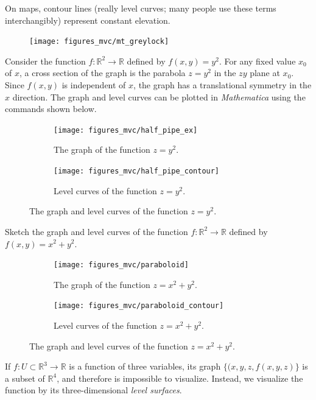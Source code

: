 \documentclass[12pt,letterpaper,reqno]{article}
\numberwithin{equation}{section}
\begin{document}
{\begin{example}
\end{example}
\begin{example}
	On maps, contour lines (really level curves; many people use these terms interchangibly) represent constant elevation.
	\begin{figure}[h]
		\begin{center}
		\texttt{[image: figures\_mvc/mt\_greylock]}
	\end{center}
	\end{figure}
\end{example}
\newpage 
\begin{example}
Consider the function $f:\mathbb{R}^2 \to \mathbb{R}$ defined by $f(x,y)=y^2$. For any fixed value $x_0$ of $x$, a cross section of the graph is the parabola $z=y^2$ in the $zy$ plane at $x_0$. Since $f(x,y)$ is independent of $x$, the graph has a translational symmetry in the $x$ direction. The graph and level curves can be plotted in \emph{Mathematica} using the commands shown below.

	\begin{figure}[h]
\centering
\begin{subfigure}{.5\textwidth}
  \centering
  \texttt{[image: figures\_mvc/half\_pipe\_ex]}
  \caption{The graph of the function $z=y^2$.}
\end{subfigure}%
\begin{subfigure}{.5\textwidth}
  \centering
  \texttt{[image: figures\_mvc/half\_pipe\_contour]}
  \caption{Level curves of the function $z=y^2$.}
\end{subfigure}
\caption{The graph and level curves of the function $z=y^2$.}
\end{figure}
\end{example}

\begin{exercise}
Sketch the graph and level curves of the function $f:\mathbb{R}^2 \to \mathbb{R}$ defined by $f(x,y)=x^2+y^2$. 	
\end{exercise}

{\color{red}
\begin{solution}
		\begin{figure}[h]
\centering
\begin{subfigure}{.5\textwidth}
  \centering
  \texttt{[image: figures\_mvc/paraboloid]}
  \caption{The graph of the function $z=x^2+y^2$.}
\end{subfigure}%
\begin{subfigure}{.5\textwidth}
  \centering
  \texttt{[image: figures\_mvc/paraboloid\_contour]}
  \caption{Level curves of the function $z=x^2+y^2$.}
\end{subfigure}
\caption{The graph and level curves of the function $z=x^2+y^2$.}
\end{figure}
\end{solution}}
If $f:U \subset \mathbb{R}^3 \to \mathbb{R}$ is a function of three variables, its graph $\{(x,y,z,f(x,y,z)\}$ is a subset of $\mathbb{R}^4$, and therefore is impossible to visualize. Instead, we visualize the function by its three-dimensional \emph{level surfaces}.

}
\end{document}
